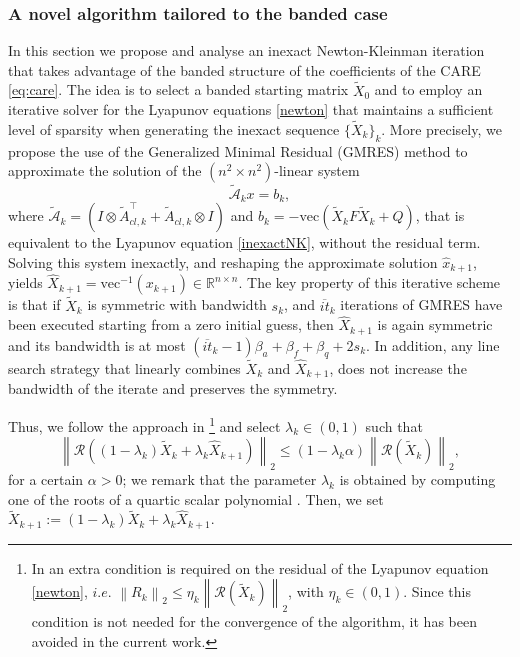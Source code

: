 \documentclass[a4paper,10pt]{article}
\newcommand{\norm}[1]{\left\lVert#1\right\rVert}
\begin{document}
\subsubsection{A novel algorithm tailored to the banded case}
\label{subsec:novel_alg}
In this section we propose and analyse an inexact Newton-Kleinman iteration that takes advantage of the banded structure of the coefficients of the CARE \eqref{eq:care}. The idea is to select a banded starting matrix $\tilde X_0$ and to employ an iterative solver for the Lyapunov equations \eqref{newton} that maintains a sufficient level of sparsity when generating the inexact sequence $\{\widetilde X_k\}_k$.  More precisely, we propose the use of the Generalized Minimal Residual (GMRES) method to approximate the solution of the $(n^2\times n^2)$-linear system
\begin{equation}
	\tilde{\mathcal{A}}_{k} x = b_{k},
	\label{linear_system_lyap}
\end{equation}
where $\tilde{\mathcal{A}}_{k}=\left(I \otimes \tilde{A}_{cl,k}^\top + \tilde{A}_{cl,k} \otimes I \right)$ and $ b_{k} = -\text{vec}(\tilde{X}_{k} F \tilde{X}_{k}+Q)$,
that is equivalent to the Lyapunov equation \eqref{inexactNK}, without the residual term. Solving this system inexactly, and reshaping the approximate solution $\widehat x_{k+1}$, yields  $\widehat  {X}_{k+1} = \text{vec}^{-1}(x_{k+1})\in\mathbb R^{n\times n}$. The key property of this iterative scheme is that if $\widetilde X_k$ is symmetric with bandwidth $s_k$,  and $\overline{it}_k$ iterations of GMRES have been executed starting from a zero initial guess, then $\widehat X_{k+1}$ is again symmetric and its bandwidth is at most $(\overline{it}_k-1)\beta_a+\beta_f+\beta_q+2s_k$.
In addition, any line search strategy that linearly combines $\tilde X_k$ and $\widehat X_{k+1}$, does not increase the bandwidth of the iterate and preserves the symmetry.

Thus, we follow the approach in \cite{benner2016inexact}\footnote{In \cite{benner2016inexact} an extra condition is required on the residual of the Lyapunov equation \eqref{newton}, $i.e.$ $\norm{R_k }_2 \le \eta_k \norm{ \mathcal{R}(\tilde{X}_k) }_2$, with $\eta_k \in (0,1)$. Since this condition is not needed for the convergence of the algorithm, it has been avoided in the current work.} and select  $\lambda_k \in (0,1)$ such that
\begin{equation}
	\norm{ \mathcal{R}((1-\lambda_k) \tilde{X}_k + \lambda_k \widehat {X}_{k+1}) }_2 \le (1-\lambda_k \alpha) \norm{ \mathcal{R}(\tilde{X}_k) }_2,
	\label{cond_linesearch}
\end{equation}
for a certain $\alpha>0$;
we remark that the parameter $\lambda_k$ is obtained by computing one of the roots of a quartic scalar polynomial \cite[equation 3.11]{benner2016inexact}. Then, we set
$\tilde X_{k+1}:=(1-\lambda_k) \widetilde{X}_k + \lambda_k \widehat {X}_{k+1}.
$
\end{document}
